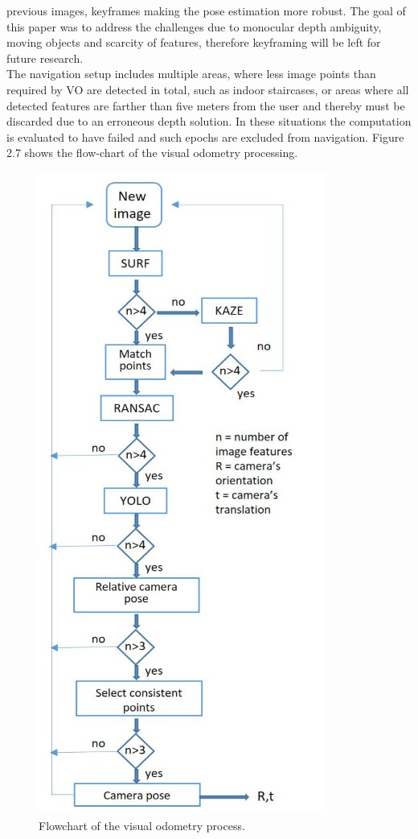 previous images, keyframes making the pose estimation more
robust. The goal of this paper was to address the challenges due to monocular depth ambiguity, moving objects and
scarcity of features, therefore keyframing will be left for future
research.\\
The navigation setup includes multiple areas, where less
image points than required by VO are detected in total, such
as indoor staircases, or areas where all detected features are
farther than five meters from the user and thereby must
be discarded due to an erroneous depth solution. In these
situations the computation is evaluated to have failed and
such epochs are excluded from navigation. Figure 2.7 shows
the flow-chart of the visual odometry processing. \\
\begin{figure}
    \centering
    \includegraphics{fig7.jpg}
    \caption{Flowchart of the visual odometry process.}
    
\end{figure}
